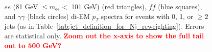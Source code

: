 \documentclass[dissertation.tex]{subfiles}
\begin{document}
\begin{figure}
	\caption{$ee$ (81 GeV $\leq m_{\mathrm{ee}} <$ 101 GeV) (red triangles), $\mathit{ff}$ (blue squares), and $\gamma\gamma$ (black circles) di-EM $p_{T}$ spectra for events with 0, 1, or $\geq 2$ jets (as in Table~\ref{tab:jet_definition_for_Nj_reweighting}).  Errors are statistical only.  \textcolor{red}{\textbf{Zoom out the x-axis to show the full tail out to 500 GeV?}}}
	\label{fig:dijet_pT}
\end{figure}

\begin{figure}
	\centering
	\hspace{1cm}

\end{figure}
\end{document}
